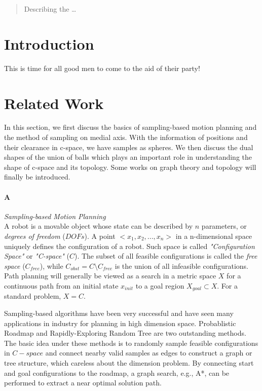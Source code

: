\documentclass[11pt]{article}
\begin{document}
\maketitle

\begin{abstract}
Describing the  \ldots
\end{abstract}

\section{Introduction}
This is time for all good men to come to the aid of their party!

\section{Related Work}\label{related work}

\indent\indent In this section, we first discuss the basics of sampling-based motion planning and the method of sampling on medial axis. With the information of positions and their clearance in c-space, we have samples as spheres. We then discuss the dual shapes of the union of balls which plays an important role in understanding the shape of c-space and its topology. Some works on graph theory and topology will finally be introduced. 

\paragraph{A} \emph{Sampling-based Motion Planning} \hfill \\
\indent A robot is a movable object whose state can be described by $n$ parameters, or \emph{degrees of freedom} ($DOFs$). A point $<x_1, x_2, ..., x_n>$ in a n-dimensional space uniquely defines the configuration of a robot. Such space is called \emph{"Configuration Space"} or \emph{"C-space"}  ($C$). The subset of all feasible configurations is called the \emph{free space} (\emph{$C_{free}$}), while $C_{obst} = C \setminus C_{free}$ is the union of all infeasible configurations. \cite{UMAPRM} Path planning will generally be viewed as a search in a metric space $X$ for a continuous path from an initial state $x_{init}$ to a goal region $X_{goal} \subset X$. For a standard problem, $X = C$. \cite{RRT}

\indent Sampling-based algorithms have been very successful and have seen many applications in industry for planning in high dimension space. Probablistic Roadmap \cite{PRM} and Rapidly-Exploring Random Tree \cite{RRT} are two outstanding methods. The basic idea under these methods is to randomly sample feasible configurations in $C-space$ and connect nearby valid samples as edges to construct a graph or tree structure, which careless about the dimension problem. By connecting start and goal configurations to the roadmap, a graph search, e.g., A*, can be performed to extract a near optimal solution path.
\end{document}
